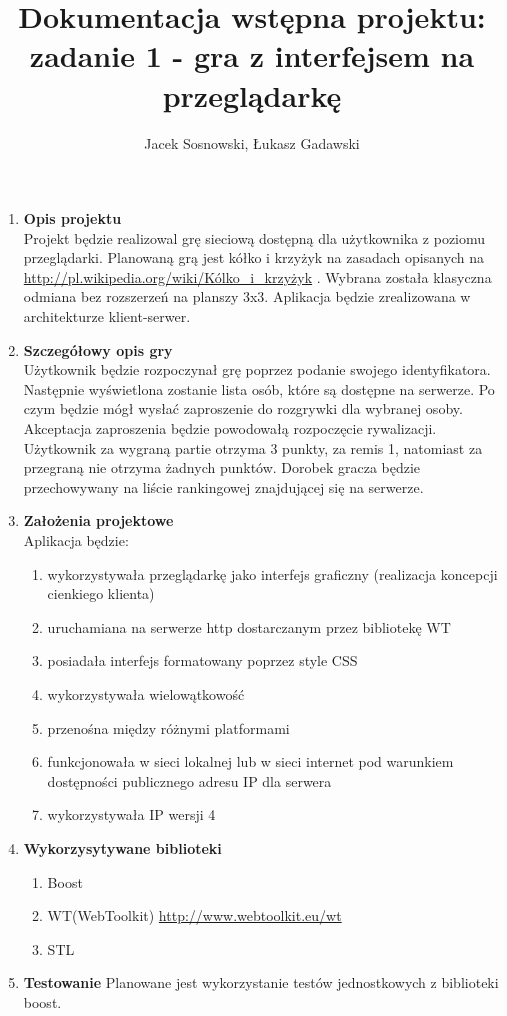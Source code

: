 \documentclass{report}
\author{Jacek Sosnowski, Łukasz Gadawski}
\title{Dokumentacja wstępna projektu: \\
\textbf{zadanie 1 - gra z interfejsem na przeglądarkę}}
\begin{document}
\maketitle

\begin{enumerate}
\item \textbf{Opis projektu} \\
Projekt będzie realizowal grę sieciową dostępną dla użytkownika z poziomu przeglądarki.
Planowaną grą jest kółko i krzyżyk na zasadach opisanych na \url{http://pl.wikipedia.org/wiki/Kólko_i_krzyżyk} .
Wybrana została klasyczna odmiana bez rozszerzeń na planszy 3x3. Aplikacja będzie zrealizowana w architekturze klient-serwer.

\item \textbf{Szczegółowy opis gry} \\
Użytkownik będzie rozpoczynał grę poprzez podanie swojego identyfikatora. Następnie wyświetlona zostanie lista osób, 
które są dostępne na serwerze. Po czym będzie mógł wysłać zaproszenie do rozgrywki dla wybranej osoby. Akceptacja
zaproszenia będzie powodowałą rozpoczęcie rywalizacji. \\
Użytkownik za wygraną partie otrzyma 3 punkty, za remis 1, natomiast za przegraną nie otrzyma żadnych punktów. 
Dorobek gracza będzie przechowywany na liście rankingowej znajdującej się na serwerze. 

\item \textbf{ Założenia projektowe}	\\
Aplikacja będzie:
\begin{enumerate}
\item wykorzystywała przeglądarkę jako interfejs graficzny (realizacja koncepcji cienkiego klienta)
\item uruchamiana na serwerze http dostarczanym przez bibliotekę WT
\item posiadała interfejs formatowany poprzez style CSS
\item wykorzystywała wielowątkowość
\item przenośna między różnymi platformami
\item funkcjonowała w sieci lokalnej lub w sieci internet pod warunkiem dostępności publicznego adresu IP dla serwera
\item wykorzystywała IP wersji 4
\end{enumerate}

\item \textbf{Wykorzysytywane biblioteki}
\begin{enumerate}
\item Boost 
\item WT(WebToolkit) \url{http://www.webtoolkit.eu/wt}
\item STL
\end{enumerate}

\item \textbf{Testowanie}
Planowane jest wykorzystanie testów jednostkowych z biblioteki boost. 
\end{enumerate}
\end{document}

